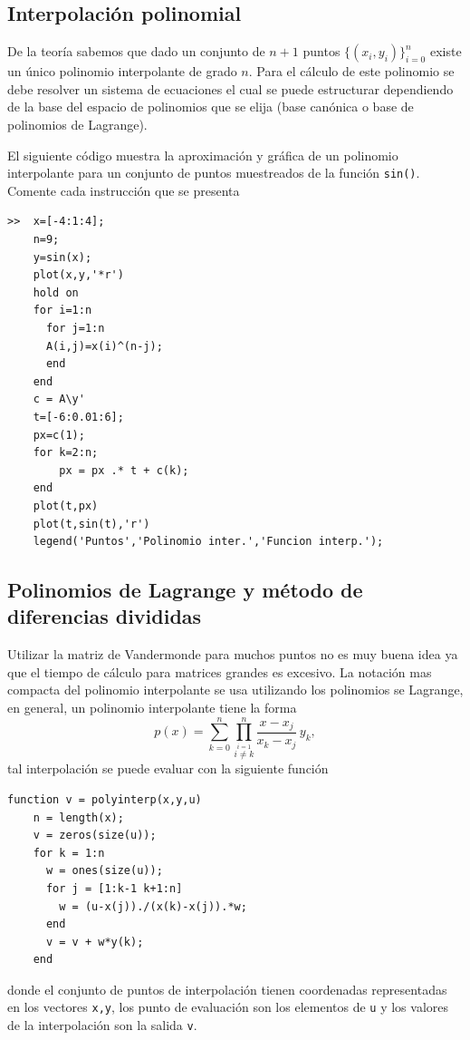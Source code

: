 \documentclass[11pt]{article}
\begin{document}
\subsection{Interpolaci\'on polinomial}
De la teor\'ia sabemos que dado un conjunto de $n+1$ puntos $\{(x_i,y_i)\}_{i=0}^{n}$ existe un \'unico polinomio interpolante de grado $n$. Para el c\'alculo de este polinomio se debe resolver un sistema de ecuaciones el cual se puede estructurar dependiendo de la base del espacio de polinomios que se elija (base can\'onica o base de polinomios de Lagrange). 

El siguiente c\'odigo muestra la aproximaci\'on y gr\'afica de un polinomio interpolante para un conjunto de puntos muestreados de la funci\'on \texttt{sin()}. Comente cada instrucci\'on que se presenta 

\begin{verbatim}
>> 	x=[-4:1:4];
	n=9;
    y=sin(x); 
    plot(x,y,'*r') 
    hold on 
    for i=1:n 
      for j=1:n 
      A(i,j)=x(i)^(n-j);  
      end 
    end 
    c = A\y' 
    t=[-6:0.01:6]; 
    px=c(1); 
    for k=2:n; 
    	px = px .* t + c(k); 
    end 
    plot(t,px)
    plot(t,sin(t),'r')
    legend('Puntos','Polinomio inter.','Funcion interp.');
\end{verbatim}


\subsection{Polinomios de Lagrange y m\'etodo de diferencias divididas}

Utilizar la matriz de Vandermonde para muchos puntos no es muy buena idea ya que el tiempo de c\'alculo para matrices grandes 
es excesivo. La notaci\'on mas compacta del polinomio interpolante se usa utilizando los polinomios se Lagrange, en general, 
un polinomio interpolante tiene la forma
$$\displaystyle
p(x)=\sum_{k=0}^{n} \prod_{\stackrel{i=1}{i\neq k}}^n \frac{x-x_j}{x_k-x_j} \, y_k,
$$
tal interpolaci\'on se puede evaluar con la siguiente funci\'on
\begin{verbatim}
function v = polyinterp(x,y,u)
    n = length(x);
    v = zeros(size(u));
    for k = 1:n
      w = ones(size(u));
      for j = [1:k-1 k+1:n]
      	w = (u-x(j))./(x(k)-x(j)).*w;
      end
      v = v + w*y(k);
    end
\end{verbatim}
donde el conjunto de puntos de interpolaci\'on tienen coordenadas representadas en los vectores \texttt{x,y}, los punto de evaluaci\'on son los elementos de \texttt{u} y los valores de la interpolaci\'on son la salida \texttt{v}.
\end{document}
